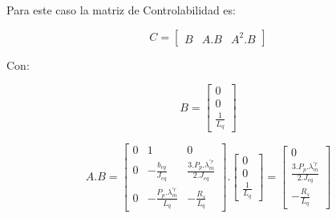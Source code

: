 \documentclass{article}
\begin{document}
Para este caso la matriz de Controlabilidad es:

\begin{equation}
    C = 
    \begin{bmatrix}
        B & A.B & A^2.B
    \end{bmatrix}
\end{equation}

Con:

\begin{equation*}
    B = 
    \begin{bmatrix}
        0 \\
        0 \\
        \frac{1}{L_q}
    \end{bmatrix}
\end{equation*}

\begin{equation*}
    A.B = 
    \begin{bmatrix}
        0 & 1 & 0 \\
        0 & -\frac{b_{eq}}{J_{eq}} & \frac{3.P_p.\lambda_m^{\prime r}}{2.J_{eq}} \\
        0 & -\frac{P_p.\lambda_m^{\prime r}}{L_q} & -\frac{R_s}{L_q}
    \end{bmatrix}.
    \begin{bmatrix}
        0 \\
        0 \\
        \frac{1}{L_q}
    \end{bmatrix}
    =
    \begin{bmatrix}
        0 \\
        \frac{3.P_p.\lambda_m^{\prime r}}{2.J_{eq}} \\
        -\frac{R_s}{L_q}
    \end{bmatrix}
\end{equation*}
\end{document}
